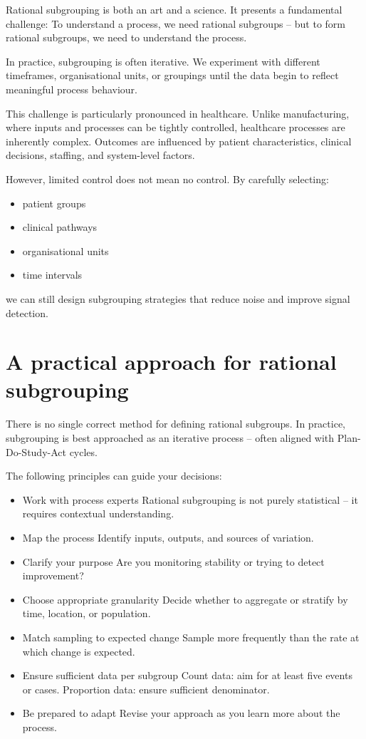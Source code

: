 \documentclass[
]{book}
\providecommand{\tightlist}{%
  \setlength{\itemsep}{0pt}\setlength{\parskip}{0pt}}
\begin{document}
Rational subgrouping is both an art and a science. It presents a fundamental challenge: To understand a process, we need rational subgroups -- but to form rational subgroups, we need to understand the process.

In practice, subgrouping is often iterative. We experiment with different timeframes, organisational units, or groupings until the data begin to reflect meaningful process behaviour.

This challenge is particularly pronounced in healthcare. Unlike manufacturing, where inputs and processes can be tightly controlled, healthcare processes are inherently complex. Outcomes are influenced by patient characteristics, clinical decisions, staffing, and system-level factors.

However, limited control does not mean no control. By carefully selecting:

\begin{itemize}
\tightlist
\item
  patient groups
\item
  clinical pathways
\item
  organisational units
\item
  time intervals
\end{itemize}

we can still design subgrouping strategies that reduce noise and improve signal detection.

\section{A practical approach for rational subgrouping}\label{a-practical-approach-for-rational-subgrouping}

There is no single correct method for defining rational subgroups. In practice, subgrouping is best approached as an iterative process -- often aligned with Plan-Do-Study-Act cycles.

The following principles can guide your decisions:

\begin{itemize}
\item
  Work with process experts
  Rational subgrouping is not purely statistical -- it requires contextual understanding.
\item
  Map the process
  Identify inputs, outputs, and sources of variation.
\item
  Clarify your purpose
  Are you monitoring stability or trying to detect improvement?
\item
  Choose appropriate granularity
  Decide whether to aggregate or stratify by time, location, or population.
\item
  Match sampling to expected change
  Sample more frequently than the rate at which change is expected.
\item
  Ensure sufficient data per subgroup
  Count data: aim for at least five events or cases.
  Proportion data: ensure sufficient denominator.
\item
  Be prepared to adapt
  Revise your approach as you learn more about the process.
\end{itemize}
\end{document}

